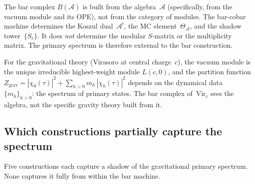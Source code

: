\documentclass[11pt]{article}
\newcommand{\cA}{\mathcal{A}}
\begin{document}
The bar complex $B(\cA)$ is built from the algebra~$\cA$
(specifically, from the vacuum module and its OPE), not from
the category of modules.  The bar-cobar machine determines the
Koszul dual~$\cA^!$, the MC element~$\Theta_\cA$, and the shadow
tower~$\{S_r\}$.  It does \emph{not} determine the modular
$S$-matrix or the multiplicity matrix.  The primary spectrum is
therefore external to the bar construction.

For the gravitational theory (Virasoro at central charge~$c$),
the vacuum module is the unique irreducible highest-weight module
$L(c,0)$, and the partition function $Z_{\mathrm{grav}}
= |\chi_0(\tau)|^2 + \sum_{h > 0} m_h\,|\chi_h(\tau)|^2$ depends
on the dynamical data $\{m_h\}_{h > 0}$: the spectrum of
primary states.  The bar complex of~$\mathrm{Vir}_c$ sees the
algebra, not the specific gravity theory built from it.

\subsection{Which constructions partially capture the spectrum}

Five constructions each capture a shadow of the gravitational
primary spectrum.  None captures it fully from within the bar
machine.
\end{document}
